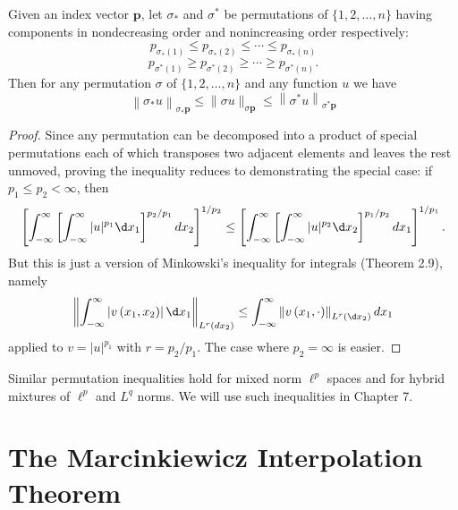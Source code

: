\begin{theorem}
  Given an index vector $\mathbf{p}$, let $\sigma_*$ and $\sigma^*$ be permutations of $\{1,2, \ldots, n\}$ having components in nondecreasing order and nonincreasing order respectively:
  \[
  p_{\sigma_*(1)} \leq p_{\sigma_*(2)} \leq \cdots \leq p_{\sigma_*(n)}
  \]
  \[
  p_{\sigma^*(1)} \geq p_{\sigma^*(2)} \geq \cdots \geq p_{\sigma^*(n)} .
  \]
  Then for any permutation $\sigma$ of $\{1,2, \ldots, n\}$ and any function $u$ we have
  \[
  \left\|\sigma_* u\right\|_{\sigma_* \mathbf{p}} \leq\|\sigma u\|_{\sigma \mathbf{p}} \leq\left\|\sigma^* u\right\|_{\sigma^* \mathbf{p}}
  \]
\end{theorem}

\begin{proof}
  Since any permutation can be decomposed into a product of special permutations each of which transposes two adjacent elements and leaves the rest unmoved, proving the inequality reduces to demonstrating the special case: if $p_1 \leq p_2<\infty$, then
  \[
  \left[\int_{-\infty}^{\infty}\left[\int_{-\infty}^{\infty}|u|^{p_1} \d x_1\right]^{p_2 / p_1} d x_2\right]^{1 / p_2} \leq\left[\int_{-\infty}^{\infty}\left[\int_{-\infty}^{\infty}|u|^{p_2} \d x_2\right]^{p_1 / p_2} d x_1\right]^{1 / p_1} .
  \]
  But this is just a version of Minkowski's inequality for integrals (Theorem 2.9), namely
  \[
  \left\|\int_{-\infty}^{\infty}\left|v\left(x_1, x_2\right)\right| \d x_1\right\|_{L^r\left(d x_2\right)} \leq \int_{-\infty}^{\infty}\left\|v\left(x_1, \cdot\right)\right\|_{L^r\left( \d x_2\right)} d x_1
  \]
  applied to $v=|u|^{p_1}$ with $r=p_2 / p_1$. The case where $p_2=\infty$ is easier.
\end{proof}


\begin{remark}
  Similar permutation inequalities hold for mixed norm $\ell^p$ spaces and for hybrid mixtures of $\ell^p$ and $L^q$ norms. We will use such inequalities in Chapter 7.
\end{remark}


\section{The Marcinkiewicz Interpolation Theorem}

